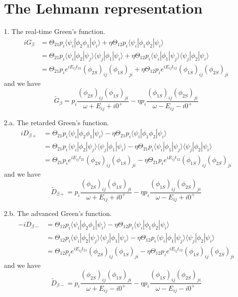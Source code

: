 \documentclass[12pt, oneside]{book}
\begin{document}
\section*{The Lehmann representation}
1. The real-time Green's function.
\begin{align*}
iG_{\beta}
&=\Theta_{21}p_i\langle\psi_i|\phi_2\phi_1|\psi_i\rangle+\eta\Theta_{12}p_i\langle\psi_i|\phi_1\phi_2|\psi_i\rangle\\
&=\Theta_{21}p_i\langle\psi_i|\phi_2|\psi_j\rangle\langle\psi_j|\phi_1|\psi_i\rangle+\eta\Theta_{12}p_i\langle\psi_i|\phi_1|\psi_j\rangle\langle\psi_j|\phi_2|\psi_i\rangle\\
&=\Theta_{21}p_ie^{iE_{ij}t_{21}}(\phi_{2S})_{ij}(\phi_{1S})_{ji}+\eta\Theta_{12}p_ie^{iE_{ij}t_{12}}(\phi_{1S})_{ij}(\phi_{2S})_{ji}
\end{align*}
and we have
\[
\widetilde{G}_{\beta}=p_i\frac{(\phi_{2S})_{ij}(\phi_{1S})_{ji}}{\omega+E_{ij}+i0^+}-\eta p_i\frac{(\phi_{1S})_{ij}(\phi_{2S})_{ji}}{\omega-E_{ij}-i0^+}
\]

2.a. The retarded Green's function.
\begin{align*}
iD_{\beta+}
&=\Theta_{21}p_i\langle\psi_i|\phi_2\phi_1|\psi_i\rangle-\eta\Theta_{21}p_i\langle\psi_i|\phi_1\phi_2|\psi_i\rangle\\
&=\Theta_{21}p_i\langle\psi_i|\phi_2|\psi_j\rangle\langle\psi_j|\phi_1|\psi_i\rangle-\eta\Theta_{21}p_i\langle\psi_i|\phi_1|\psi_j\rangle\langle\psi_j|\phi_2|\psi_i\rangle\\
&=\Theta_{21}p_ie^{iE_{ij}t_{21}}(\phi_{2S})_{ij}(\phi_{1S})_{ji}-\eta\Theta_{21}p_ie^{iE_{ij}t_{12}}(\phi_{1S})_{ij}(\phi_{2S})_{ji}
\end{align*}
and we have
\[
\widetilde{D}_{\beta+}=p_i\frac{(\phi_{2S})_{ij}(\phi_{1S})_{ji}}{\omega+E_{ij}+i0^+}-\eta p_i\frac{(\phi_{1S})_{ij}(\phi_{2S})_{ji}}{\omega-E_{ij}+i0^+}
\]

2.b. The advanced Green's function.
\begin{align*}
-iD_{\beta-}
&=\Theta_{12}p_i\langle\psi_i|\phi_2\phi_1|\psi_i\rangle-\eta\Theta_{12}p_i\langle\psi_i|\phi_1\phi_2|\psi_i\rangle\\
&=\Theta_{12}p_i\langle\psi_i|\phi_2|\psi_j\rangle\langle\psi_j|\phi_1|\psi_i\rangle-\eta\Theta_{12}p_i\langle\psi_i|\phi_1|\psi_j\rangle\langle\psi_j|\phi_2|\psi_i\rangle\\
&=\Theta_{12}p_ie^{iE_{ij}t_{21}}(\phi_{2S})_{ij}(\phi_{1S})_{ji}-\eta\Theta_{12}p_ie^{iE_{ij}t_{12}}(\phi_{1S})_{ij}(\phi_{2S})_{ji}
\end{align*}
and we have
\[
\widetilde{D}_{\beta-}=p_i\frac{(\phi_{2S})_{ij}(\phi_{1S})_{ji}}{\omega+E_{ij}-i0^+}-\eta p_i\frac{(\phi_{1S})_{ij}(\phi_{2S})_{ji}}{\omega-E_{ij}-i0^+}
\]
\end{document}
